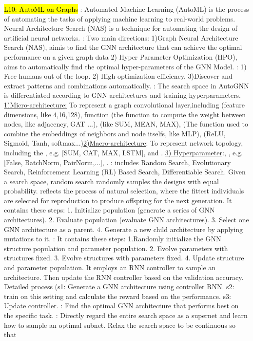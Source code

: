 \hl{L10: AutoML on Graphs}
: Automated Machine Learning (AutoML) is the process of automating the tasks of applying machine learning to real-world problems. Neural Architecture Search (NAS) is a technique for automating the design of artificial neural networks. : Two main directions: 1)Graph Neural Architecture Search (NAS), aimis to find the GNN architecture that can achieve the optimal performance on a given graph data 2) Hyper Parameter Optimization (HPO), aims to automatically find the optimal hyper-parameters of the GNN Model. : 1) Free humans out of the loop. 2) High optimization efficiency. 3)Discover and extract patterns and combinations automatically. : The search space in AutoGNN is differentiated according to GNN architectures and training hyperparameters. \underline{1)Micro-architecture:} To represent a graph convolutional layer,including  (feature dimensions, like 4,16,128),  function (the function to compute the weight between nodes, like adjacency, GAT ...),  (like SUM, MEAN, MAX),  (The function used to combine the embeddings of neighbors and node itselfs, like MLP),  (ReLU, Sigmoid, Tanh, softmax...)\underline{2)Macro-architecture}: To represent network topology, including the ,  e.g. [SUM, CAT, MAX, LSTM], and . \underline{3) Hyperparameter}:, ,  e.g. [False, BatchNorm, PairNorm,...], . : includes Random Search, Evolutionary Search, Reinforcement Learning (RL) Based Search, Differentiable Search.  Given a search space, random search randomly samples the designs with equal probability.   reflects the process of natural selection, where the fittest individuals are selected for reproduction to produce offspring for the next generation. It contains these steps: 1. Initialize population (generate a series of GNN architectures). 2. Evaluate population (evaluate GNN architectures). 3. Select one GNN architecture as a parent. 4. Generate a new child architecture by applying mutations to it. : It contains these steps: 1.Randomly initialize the GNN structure population and parameter population. 2. Evolve parameters with structures fixed. 3. Evolve structures with parameters fixed. 4. Update structure and parameter population.  It employs an RNN controller to sample an architecture. Then update the RNN controller based on the validation accuracy. Detailed process (s1: Generate a GNN architecture using controller RNN. s2: train on this setting and calculate the reward based on the performance. s3: Update controller.  : Find the optimal GNN architecture that performs best on the specific task. : Directly regard the entire search space as a supernet and learn how to sample an optimal subnet. Relax the search space to be continuous so that 